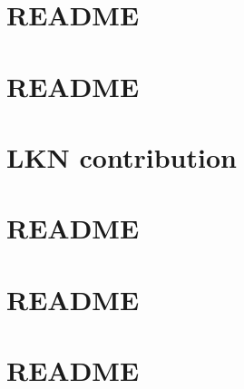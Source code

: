 \documentclass[twoside]{book}
\newcommand{\+}{\discretionary{\mbox{\scriptsize$\hookleftarrow$}}{}{}}
\begin{document}
\chapter{R\+E\+A\+D\+ME}
\label{md__home_lkn_off_cloud__smartgrid-code__git_hub_openwsn-fw_bsp_boards__open_mote-_c_c2538__r_e_a_d_m_e}
\hypertarget{md__home_lkn_off_cloud__smartgrid-code__git_hub_openwsn-fw_bsp_boards__open_mote-_c_c2538__r_e_a_d_m_e}{}

\chapter{R\+E\+A\+D\+ME}
\label{md__home_lkn_off_cloud__smartgrid-code__git_hub_openwsn-fw_bsp__r_e_a_d_m_e}
\hypertarget{md__home_lkn_off_cloud__smartgrid-code__git_hub_openwsn-fw_bsp__r_e_a_d_m_e}{}

\chapter{L\+KN contribution}
\label{_l_k_n_contribution}
\hypertarget{_l_k_n_contribution}{}

\chapter{R\+E\+A\+D\+ME}
\label{md__home_lkn_off_cloud__smartgrid-code__git_hub_openwsn-fw_drivers__r_e_a_d_m_e}
\hypertarget{md__home_lkn_off_cloud__smartgrid-code__git_hub_openwsn-fw_drivers__r_e_a_d_m_e}{}

\chapter{R\+E\+A\+D\+ME}
\label{md__home_lkn_off_cloud__smartgrid-code__git_hub_openwsn-fw_inc__r_e_a_d_m_e}
\hypertarget{md__home_lkn_off_cloud__smartgrid-code__git_hub_openwsn-fw_inc__r_e_a_d_m_e}{}

\chapter{R\+E\+A\+D\+ME}
\label{md__home_lkn_off_cloud__smartgrid-code__git_hub_openwsn-fw_kernel_freertos__r_e_a_d_m_e}
\hypertarget{md__home_lkn_off_cloud__smartgrid-code__git_hub_openwsn-fw_kernel_freertos__r_e_a_d_m_e}{}

\end{document}
